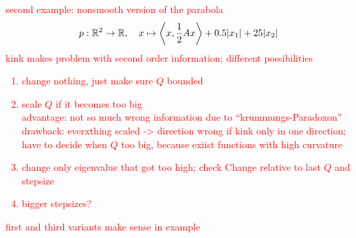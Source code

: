 \textcolor{red}{second example: nonsmooth version of the parabola
\[ p: \mathbb{R}^2 \to \mathbb{R}, \quad x \mapsto \left\langle x, \frac{1}{2}Ax\right\rangle + 0.5 |x_1|+25|x_2|\]
kink makes problem with second order information; different possibilities\\
\begin{enumerate}
	\item change nothing, just make sure \(Q\) bounded
	\item scale \(Q\) if it becomes too big \\
	advantage: not so much wrong information due to ``krummungs-Paradoxon''\\
	drawback: everxthing scaled -> direction wrong if kink only in one direction; have to decide when \(Q\) too big, because exiist functions with high curvature
	\item change only eigenvalue that got too high; check Change relative to last \(Q\) and stepsize
	\item bigger stepsizes?
\end{enumerate}
first and third variants make sense in example}



